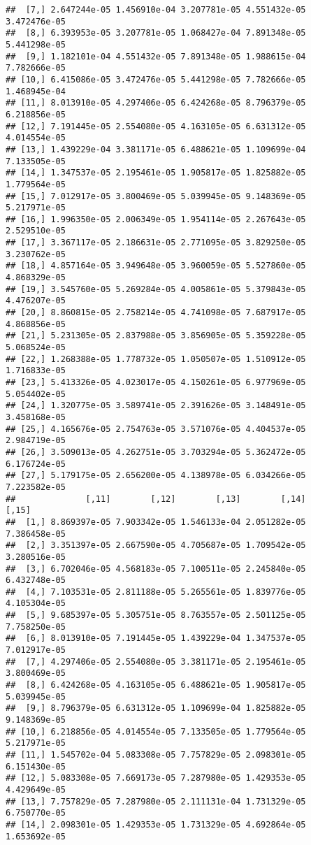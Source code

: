 \documentclass[
]{article}
\begin{document}
\begin{verbatim}
##  [7,] 2.647244e-05 1.456910e-04 3.207781e-05 4.551432e-05 3.472476e-05
##  [8,] 6.393953e-05 3.207781e-05 1.068427e-04 7.891348e-05 5.441298e-05
##  [9,] 1.182101e-04 4.551432e-05 7.891348e-05 1.988615e-04 7.782666e-05
## [10,] 6.415086e-05 3.472476e-05 5.441298e-05 7.782666e-05 1.468945e-04
## [11,] 8.013910e-05 4.297406e-05 6.424268e-05 8.796379e-05 6.218856e-05
## [12,] 7.191445e-05 2.554080e-05 4.163105e-05 6.631312e-05 4.014554e-05
## [13,] 1.439229e-04 3.381171e-05 6.488621e-05 1.109699e-04 7.133505e-05
## [14,] 1.347537e-05 2.195461e-05 1.905817e-05 1.825882e-05 1.779564e-05
## [15,] 7.012917e-05 3.800469e-05 5.039945e-05 9.148369e-05 5.217971e-05
## [16,] 1.996350e-05 2.006349e-05 1.954114e-05 2.267643e-05 2.529510e-05
## [17,] 3.367117e-05 2.186631e-05 2.771095e-05 3.829250e-05 3.230762e-05
## [18,] 4.857164e-05 3.949648e-05 3.960059e-05 5.527860e-05 4.868329e-05
## [19,] 3.545760e-05 5.269284e-05 4.005861e-05 5.379843e-05 4.476207e-05
## [20,] 8.860815e-05 2.758214e-05 4.741098e-05 7.687917e-05 4.868856e-05
## [21,] 5.231305e-05 2.837988e-05 3.856905e-05 5.359228e-05 5.068524e-05
## [22,] 1.268388e-05 1.778732e-05 1.050507e-05 1.510912e-05 1.716833e-05
## [23,] 5.413326e-05 4.023017e-05 4.150261e-05 6.977969e-05 5.054402e-05
## [24,] 1.320775e-05 3.589741e-05 2.391626e-05 3.148491e-05 3.458168e-05
## [25,] 4.165676e-05 2.754763e-05 3.571076e-05 4.404537e-05 2.984719e-05
## [26,] 3.509013e-05 4.262751e-05 3.703294e-05 5.362472e-05 6.176724e-05
## [27,] 5.179175e-05 2.656200e-05 4.138978e-05 6.034266e-05 7.223582e-05
##              [,11]        [,12]        [,13]        [,14]        [,15]
##  [1,] 8.869397e-05 7.903342e-05 1.546133e-04 2.051282e-05 7.386458e-05
##  [2,] 3.351397e-05 2.667590e-05 4.705687e-05 1.709542e-05 3.280516e-05
##  [3,] 6.702046e-05 4.568183e-05 7.100511e-05 2.245840e-05 6.432748e-05
##  [4,] 7.103531e-05 2.811188e-05 5.265561e-05 1.839776e-05 4.105304e-05
##  [5,] 9.685397e-05 5.305751e-05 8.763557e-05 2.501125e-05 7.758250e-05
##  [6,] 8.013910e-05 7.191445e-05 1.439229e-04 1.347537e-05 7.012917e-05
##  [7,] 4.297406e-05 2.554080e-05 3.381171e-05 2.195461e-05 3.800469e-05
##  [8,] 6.424268e-05 4.163105e-05 6.488621e-05 1.905817e-05 5.039945e-05
##  [9,] 8.796379e-05 6.631312e-05 1.109699e-04 1.825882e-05 9.148369e-05
## [10,] 6.218856e-05 4.014554e-05 7.133505e-05 1.779564e-05 5.217971e-05
## [11,] 1.545702e-04 5.083308e-05 7.757829e-05 2.098301e-05 6.151430e-05
## [12,] 5.083308e-05 7.669173e-05 7.287980e-05 1.429353e-05 4.429649e-05
## [13,] 7.757829e-05 7.287980e-05 2.111131e-04 1.731329e-05 6.750770e-05
## [14,] 2.098301e-05 1.429353e-05 1.731329e-05 4.692864e-05 1.653692e-05

\end{verbatim}
\end{document}
